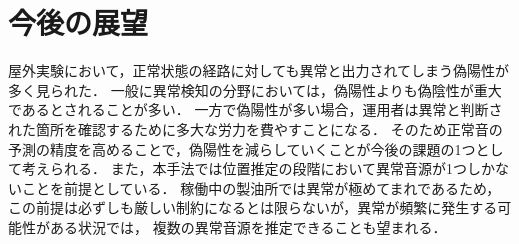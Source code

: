 \documentclass[../main]{subfiles}
\begin{document}
\section{今後の展望}
\label{sec:conc_future}
屋外実験において，正常状態の経路に対しても異常と出力されてしまう偽陽性が多く見られた．
一般に異常検知の分野においては，偽陽性よりも偽陰性が重大であるとされることが多い．
一方で偽陽性が多い場合，運用者は異常と判断された箇所を確認するために多大な労力を費やすことになる．
そのため正常音の予測の精度を高めることで，偽陽性を減らしていくことが今後の課題の1つとして考えられる．
また，本手法では位置推定の段階において異常音源が1つしかないことを前提としている．
稼働中の製油所では異常が極めてまれであるため，この前提は必ずしも厳しい制約になるとは限らないが，異常が頻繁に発生する可能性がある状況では，
複数の異常音源を推定できることも望まれる．
\end{document}
